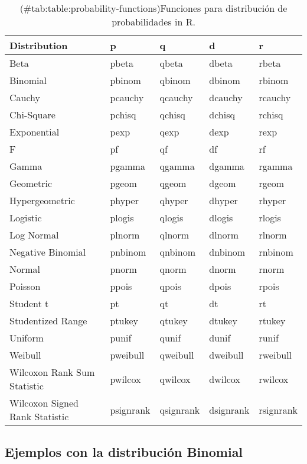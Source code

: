 \documentclass[
]{book}
\begin{document}
\begin{table}[!h]

\caption{(\#tab:table:probability-functions)Funciones para distribución de probabilidades in R.}
\centering
\fontsize{12}{14}\selectfont
\begin{tabular}[t]{>{\raggedright\arraybackslash}p{0.5in}>{\raggedright\arraybackslash}p{0.7in}>{\raggedright\arraybackslash}p{1in}>{\raggedright\arraybackslash}p{1.1in}>{\raggedright\arraybackslash}p{1in}}
\toprule
Distribution & p & q & d & r\\
\midrule
Beta & pbeta & qbeta & dbeta & rbeta\\
Binomial & pbinom & qbinom & dbinom & rbinom\\
Cauchy & pcauchy & qcauchy & dcauchy & rcauchy\\
Chi-Square & pchisq & qchisq & dchisq & rchisq\\
Exponential & pexp & qexp & dexp & rexp\\
F & pf & qf & df & rf\\
Gamma & pgamma & qgamma & dgamma & rgamma\\
Geometric & pgeom & qgeom & dgeom & rgeom\\
Hypergeometric & phyper & qhyper & dhyper & rhyper\\
Logistic & plogis & qlogis & dlogis & rlogis\\
Log Normal & plnorm & qlnorm & dlnorm & rlnorm\\
Negative Binomial & pnbinom & qnbinom & dnbinom & rnbinom\\
Normal & pnorm & qnorm & dnorm & rnorm\\
Poisson & ppois & qpois & dpois & rpois\\
Student t & pt & qt & dt & rt\\
Studentized Range & ptukey & qtukey & dtukey & rtukey\\
Uniform & punif & qunif & dunif & runif\\
Weibull & pweibull & qweibull & dweibull & rweibull\\
Wilcoxon Rank Sum Statistic & pwilcox & qwilcox & dwilcox & rwilcox\\
Wilcoxon Signed Rank Statistic & psignrank & qsignrank & dsignrank & rsignrank\\
\bottomrule
\end{tabular}
\end{table}

\hypertarget{ejemplos-con-la-distribuciuxf3n-binomial}{%
\subsection{Ejemplos con la distribución Binomial}\label{ejemplos-con-la-distribuciuxf3n-binomial}}
\end{document}
